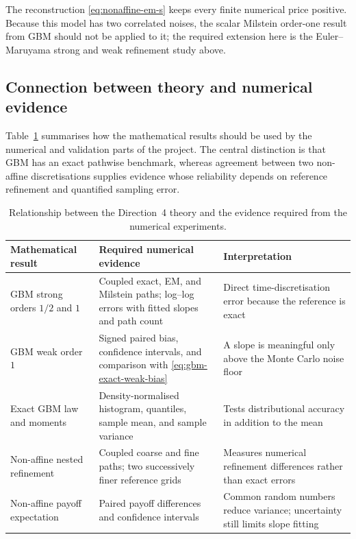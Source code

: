 The reconstruction \eqref{eq:nonaffine-em-s} keeps every finite numerical price
positive.  Because this model has two correlated noises, the scalar Milstein
order-one result from GBM should not be applied to it; the required extension
here is the Euler--Maruyama strong and weak refinement study above.

\subsection{Connection between theory and numerical evidence}
\label{subsec:theory-evidence-map}

Table~\ref{tab:theory-evidence} summarises how the mathematical results should
be used by the numerical and validation parts of the project.  The central
distinction is that GBM has an exact pathwise benchmark, whereas agreement
between two non-affine discretisations supplies evidence whose reliability
depends on reference refinement and quantified sampling error.

\begin{table}[htbp]
    \centering
    \small
    \begin{tabular}{@{}p{}p{}p{}@{}}
        \toprule
        Mathematical result & Required numerical evidence & Interpretation \\
        \midrule
        GBM strong orders $1/2$ and $1$
          & Coupled exact, EM, and Milstein paths; log--log errors with fitted slopes and path count
          & Direct time-discretisation error because the reference is exact \\
        GBM weak order $1$
          & Signed paired bias, confidence intervals, and comparison with \eqref{eq:gbm-exact-weak-bias}
          & A slope is meaningful only above the Monte Carlo noise floor \\
        Exact GBM law and moments
          & Density-normalised histogram, quantiles, sample mean, and sample variance
          & Tests distributional accuracy in addition to the mean \\
        Non-affine nested refinement
          & Coupled coarse and fine paths; two successively finer reference grids
          & Measures numerical refinement differences rather than exact errors \\
        Non-affine payoff expectation
          & Paired payoff differences and confidence intervals
          & Common random numbers reduce variance; uncertainty still limits slope fitting \\
        \bottomrule
    \end{tabular}
    \caption{Relationship between the Direction~4 theory and the evidence required from the numerical experiments.}
    \label{tab:theory-evidence}
\end{table}
